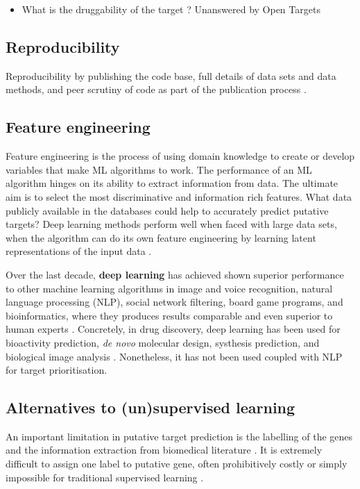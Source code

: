 \begin{itemize}
    \item What is the druggability of the target \cite{freudenberg2018, finan2017}? Unanswered by Open Targets

\end{itemize}

\subsection{Reproducibility}
Reproducibility by publishing the code base, full details of data sets and data methods, and peer scrutiny of code as part of the publication process \cite{brown2018}.

\subsection{Feature engineering}

Feature engineering is the process of using domain knowledge to create or develop variables that make ML algorithms to work. The performance of an ML algorithm hinges on its ability to extract information from data. The ultimate aim is to select the most discriminative and information rich features. What data publicly available in the databases could help to accurately predict putative targets?
Deep learning methods perform well when faced with large data sets, when the algorithm can do its own feature engineering by learning latent representations of the input data \cite{brown2018}.

Over the last decade, \textbf{deep learning} has achieved shown superior performance to other machine learning algorithms in image and voice recognition, natural language processing (NLP), social network filtering, board game programs, and bioinformatics, where they produces results comparable and even superior to human experts \cite{chenDL2018}. Concretely, in drug discovery, deep learning has been used for bioactivity prediction, \emph{de novo} molecular design, systhesis prediction, and biological image analysis \cite{chenDL2018}. Nonetheless, it has not been used coupled with NLP for target prioritisation.

\subsection{Alternatives to (un)supervised learning}
An important limitation in putative target prediction is the labelling of the genes and the information extraction from biomedical literature \cite{brown2018}. It is extremely difficult to assign one label to putative gene, often prohibitively costly or simply impossible for traditional supervised learning \cite{brown2018}.

